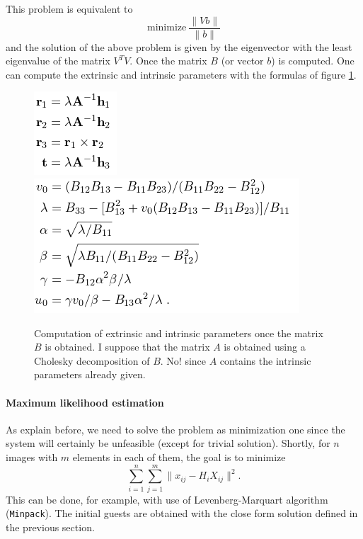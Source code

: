 \documentclass[11pt,a4paper]{article}
\begin{document}
This problem is equivalent to 
\begin{equation}
\text{minimize}~ \frac{\|Vb\|}{\|b\|}
\end{equation}
and the solution of the above problem is given by the eigenvector with the least eigenvalue of the matrix $V^TV$. Once the matrix $B$ (or vector $b$) is computed. One can compute the extrinsic and intrinsic parameters with the formulas of figure \ref{CameraCalibrationParameters}.
\begin{figure}[!h]
\centering
\includegraphics[scale=0.6]{Pictures/ExtrinsicCalibration.png}
\hspace{1cm}
\includegraphics[scale=0.6]{Pictures/IntrinsicCalibration.png}
\caption{Computation of extrinsic and intrinsic parameters once the matrix $B$ is obtained. I suppose that the matrix $A$ is obtained using a Cholesky decomposition of $B$. No! since $A$ contains the intrinsic parameters already given. \label{CameraCalibrationParameters}}
\end{figure}

\paragraph{Maximum likelihood estimation}
As explain before, we need to solve the problem as minimization one since the system will certainly be unfeasible (except for trivial solution). Shortly, for $n$ images with $m$ elements in each of them, the goal is to minimize
\begin{equation}
\sum_{i=1}^{n} \sum_{j=1}^{m} \| x_{ij} - H_i X_{ij} \|^2.
\end{equation}
This can be done, for example, with use of Levenberg-Marquart algorithm (\texttt{Minpack}). The initial guests are obtained with the close form solution defined in the previous section.
\end{document}
